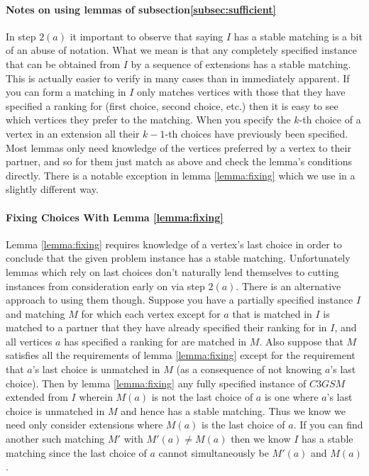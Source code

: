 \paragraph{Notes on using lemmas of subsection\ref{subsec:sufficient}}
In step $2(a)$ it important to observe that saying $I$ has a stable matching is a bit of an abuse of notation. What we mean is that any completely specified instance that can be obtained from $I$ by a sequence of extensions has a stable matching. This is actually easier to verify in many cases than in immediately apparent. If you can form a matching in $I$ only  matches vertices with those that they have specified a ranking for (first choice, second choice, etc.) then it is easy to see which vertices they prefer to the matching. When you specify the $k$-th choice of a vertex in an extension all their $k-1$-th choices have previously been specified. Most lemmas only need knowledge of the vertices preferred by a vertex to their partner, and so for them just match as above and check the lemma's conditions directly. There is a notable exception in lemma \ref{lemma:fixing} which we use in a slightly different way.
\paragraph{Fixing Choices With Lemma \ref{lemma:fixing}}
Lemma \ref{lemma:fixing} requires knowledge of a vertex's last choice in order to conclude that the given problem instance has a stable matching. Unfortunately lemmas which rely on last choices don't naturally lend themselves to cutting instances from consideration early on via step $2(a)$. There is an alternative approach to using them though. Suppose you have a partially specified instance $I$ and matching $M$ for which each vertex except for $a$ that is matched in $I$ is matched to a partner that they have already specified their ranking for in $I$, and all vertices $a$ has specified a ranking for are matched in $M$. Also suppose that $M$ satisfies all the requirements of lemma \ref{lemma:fixing} except for the requirement that $a$'s last choice is unmatched in $M$ (as a consequence of not knowing $a$'s last choice). Then by lemma \ref{lemma:fixing} any fully specified instance of $C3GSM$ extended from $I$ wherein $M(a)$ is not the last choice of $a$ is one where $a$'s last choice is unmatched in $M$ and hence has a stable matching. Thus we know we need only consider extensions where $M(a)$ is the last choice of $a$. If you can find another such matching $M'$ with $M'(a) \neq M(a)$ then we know $I$ has a stable matching since the last choice of $a$ cannot simultaneously be $M'(a)$ and $M(a)$.
